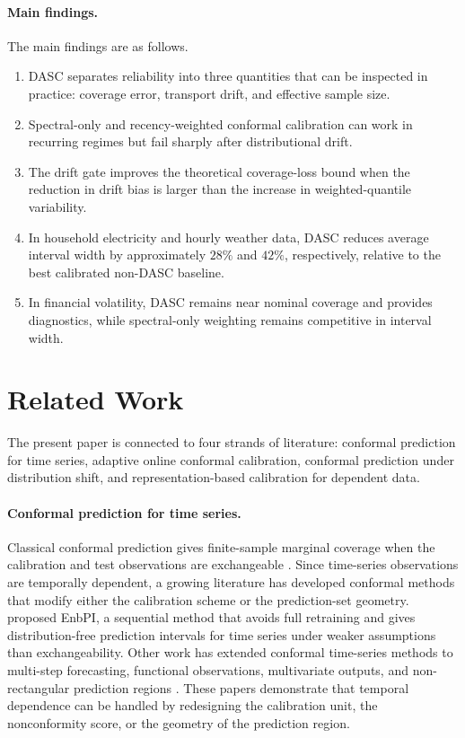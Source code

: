 \documentclass[11pt]{article}
\begin{document}
\paragraph{Main findings.}
The main findings are as follows.
\begin{enumerate}[label=(\roman*)]
    \item DASC separates reliability into three quantities that can be inspected in practice: coverage error, transport drift, and effective sample size.
    \item Spectral-only and recency-weighted conformal calibration can work in recurring regimes but fail sharply after distributional drift.
    \item The drift gate improves the theoretical coverage-loss bound when the reduction in drift bias is larger than the increase in weighted-quantile variability.
    \item In household electricity and hourly weather data, DASC reduces average interval width by approximately $28\%$ and $42\%$, respectively, relative to the best calibrated non-DASC baseline.
    \item In financial volatility, DASC remains near nominal coverage and provides diagnostics, while spectral-only weighting remains competitive in interval width.
\end{enumerate}

\section{Related Work}

The present paper is connected to four strands of literature: conformal prediction for time series, adaptive online conformal calibration, conformal prediction under distribution shift, and representation-based calibration for dependent data.

\paragraph{Conformal prediction for time series.}
Classical conformal prediction gives finite-sample marginal coverage when the calibration and test observations are exchangeable \citep{vovk2005algorithmic,angelopoulos2021gentle}. Since time-series observations are temporally dependent, a growing literature has developed conformal methods that modify either the calibration scheme or the prediction-set geometry. \citet{xu2020time} proposed EnbPI, a sequential method that avoids full retraining and gives distribution-free prediction intervals for time series under weaker assumptions than exchangeability. Other work has extended conformal time-series methods to multi-step forecasting, functional observations, multivariate outputs, and non-rectangular prediction regions \citep{sun2022copula,cleaveland2023linear,xu2024ellipsoidal,lee2025flow}. These papers demonstrate that temporal dependence can be handled by redesigning the calibration unit, the nonconformity score, or the geometry of the prediction region.
\end{document}
